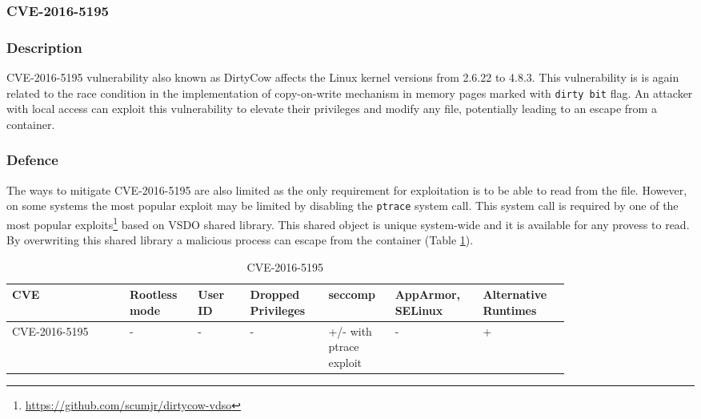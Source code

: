 \subsubsection{CVE-2016-5195}
\subsubsection*{Description}

CVE-2016-5195 vulnerability also known as DirtyCow affects the Linux kernel versions from 2.6.22 to 4.8.3. This vulnerability is is again related to the race condition in the implementation of copy-on-write mechanism in memory pages marked with \texttt{dirty bit} flag. An attacker with local access can exploit this vulnerability to elevate their privileges and modify any file, potentially leading to an escape from a container.

\subsubsection*{Defence}

The ways to mitigate CVE-2016-5195 are also limited as the only requirement for exploitation is to be able to read from the file. However, on some systems the most popular exploit may be limited by disabling the \texttt{ptrace} system call. This system call is required by one of the most popular exploits\footnote{\url{https://github.com/scumjr/dirtycow-vdso}} based on VSDO shared library. This shared object is unique system-wide and it is available for any provess to read. By overwriting this shared library a malicious process can escape from the container (Table \ref{tab:h:9}).

\begin{table}[H]
    \centering \small
    \begin{tabular}{| p{0.18\linewidth} | p{0.1\linewidth} | p{0.08\linewidth} | p{0.12\linewidth} | p{0.09\linewidth} | p{0.12\linewidth} | p{0.12\linewidth} |} \hline
    CVE & Rootless mode & User ID & Dropped Privileges & seccomp & AppArmor, SELinux & Alternative Runtimes \\ \hline
    CVE-2016-5195 & - & - & - & \cellcolor{yellow!25} +/- \linebreak with ptrace exploit & - & \cellcolor{green!25} + \\ \hline
    \end{tabular}
    \caption{CVE-2016-5195}
    \label{tab:h:9}
\end{table}



